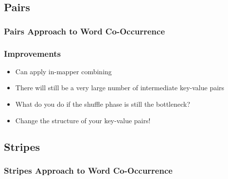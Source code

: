 \documentclass[xcolor=x11names,compress]{beamer}
\renewcommand{\(}{\begin{columns}}
\renewcommand{\)}{\end{columns}}
\newcommand{\<}[1]{\begin{column}{#1}}
\renewcommand{\>}{\end{column}}
\begin{document}
\subsection{Pairs}
\begin{frame}
  \frametitle{Pairs Approach to Word Co-Occurrence}
  \small
  \begin{algorithm}[H]
  \end{algorithm}
\end{frame}

\begin{frame}
  \frametitle{Improvements}
  \begin{itemize}
  \item<1,2> Can apply in-mapper combining
  \item<2> There will still be a very large number of intermediate
    key-value pairs
  \item<3,4> What do you do if the shuffle phase is still the bottleneck?
  \item<4> Change the structure of your key-value pairs!
  \end{itemize}
\end{frame}

\subsection{Stripes}

\begin{frame}
  \frametitle{Stripes Approach to Word Co-Occurrence}
  \footnotesize
  \begin{algorithm}[H]
  \end{algorithm}
\end{frame}
\end{document}

